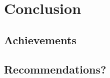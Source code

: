 \documentclass[../dissertation.tex]{subfiles}
\begin{document}
\chapter{Conclusion}

\section{Achievements}

\section{Recommendations?}
\end{document}
